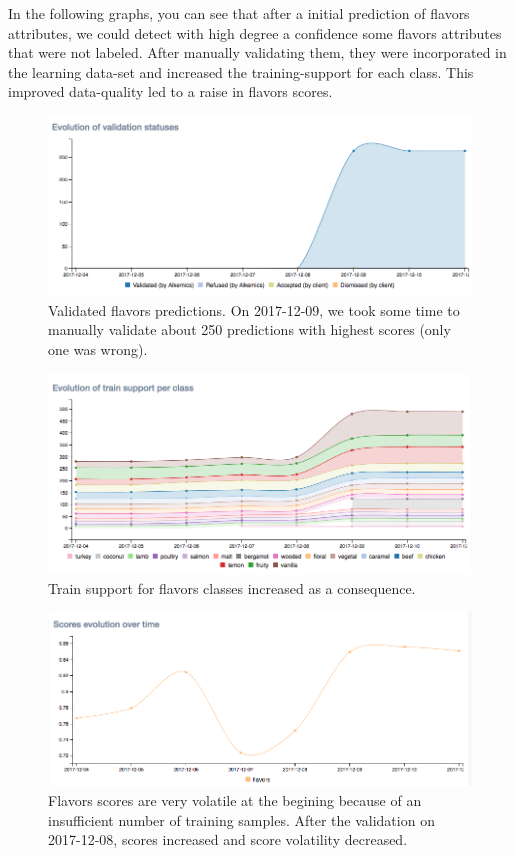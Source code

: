 In the following graphs, you can see that after a initial prediction of flavors attributes, we could detect with high degree a confidence some flavors attributes that were not labeled. After manually validating them, they were incorporated in the learning data-set and increased the training-support for each class. This improved data-quality led to a raise in flavors scores.

\begin{figure}[H]
\centering
\includegraphics[scale=0.5]{./images/incompletely-labeled/validation-flavors.png}
\caption{Validated flavors predictions. On 2017-12-09, we took some time to manually validate about 250 predictions with highest scores (only one was wrong).}
\end{figure}


\begin{figure}[H]
\centering
\includegraphics[scale=0.5]{./images/incompletely-labeled/train-support-flavors.png}
\caption{Train support for flavors classes increased as a consequence.}
\end{figure}


\begin{figure}[H]
\centering
\includegraphics[scale=0.5]{./images/incompletely-labeled/scores-flavors.png}
\caption{Flavors scores are very volatile at the begining because of an insufficient number of training samples. After the validation on 2017-12-08, scores increased and score volatility decreased.}
\end{figure}


